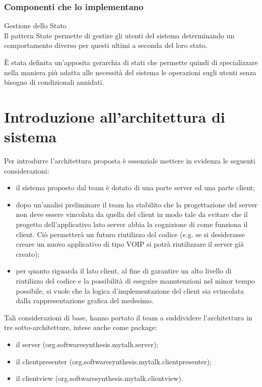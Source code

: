 \subsubsection{Componenti che lo implementano}
\begin{description}
\item{Gestione dello Stato}\\
Il pattern State permette di gestire gli utenti del sistema determinando un comportamento diverso per questi ultimi a seconda del loro stato.

È stata definita un'apposita gerarchia di stati che permette quindi di specializzare nella maniera più adatta alle necessità del sistema le operazioni sugli utenti senza bisogno di condizionali annidati.
\end{description}
\clearpage

\section{Introduzione all'architettura di sistema}
Per introdurre l'architettura proposta è essenziale mettere in evidenza le seguenti considerazioni:
\begin{itemize}
	\item il sistema proposto dal team è dotato di una parte server ed una parte client;
	\item dopo un'analisi preliminare il team ha stabilito che la progettazione del server non deve essere vincolata da quella del client in modo tale da evitare che il progetto dell'applicativo lato server abbia la cognizione di come funziona il client. Ciò permetterà un futuro riutilizzo del codice (e.g. se si desiderasse creare un nuovo applicativo di tipo VOIP si potrà riutilizzare il server già creato);
	\item per quanto riguarda il lato client, al fine di garantire un alto livello di riutilizzo del codice e la possibilità di eseguire manutenzioni nel minor tempo possibile, si vuole che la logica d'implementazione del client sia svincolata dalla rappresentazione grafica del medesimo.
\end{itemize}

Tali considerazioni di base, hanno portato il team a suddividere l'architettura in tre sotto-architetture, intese anche come package:
\begin{itemize}
	\item il server (org.softwaresynthesis.mytalk.server);
	\item il clientpresenter (org.softwaresynthesis.mytalk.clientpresenter);
	\item il clientview (org.softwaresynthesis.mytalk.clientview).
\end{itemize}

